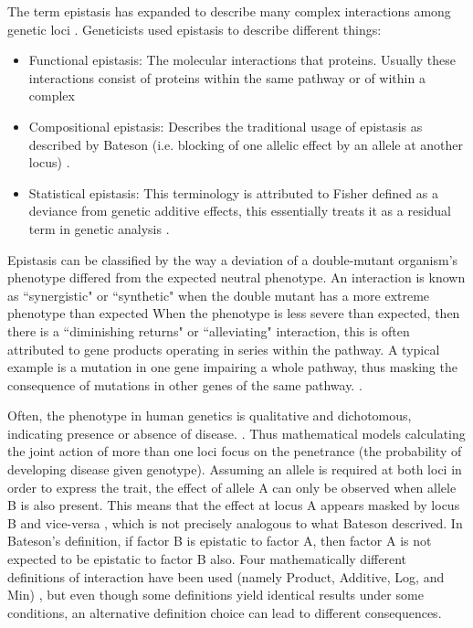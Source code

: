 The term epistasis has expanded to describe many complex interactions among genetic loci  \cite{phillips2008epistasis}.
Geneticists used epistasis to describe different things: 
\begin{itemize}
	\item Functional epistasis: The molecular interactions that proteins. Usually these interactions consist of proteins within the same pathway or of within a complex \cite{phillips2008epistasis}
	\item Compositional epistasis: Describes the traditional usage of epistasis as described by Bateson (i.e. blocking of one allelic effect by an allele at another locus)  \cite{phillips2008epistasis}.
	\item Statistical epistasis: This terminology is attributed to Fisher defined as a deviance from genetic additive effects, this essentially treats it as a residual term in genetic analysis \cite{zhao2006test}.
\end{itemize}

Epistasis can be classified by the way a deviation of a double-mutant organism's phenotype differed from the expected neutral phenotype\cite{mani2008defining}.
An interaction is known as ``synergistic" or ``synthetic" when the double mutant has a more extreme phenotype than expected
When the phenotype is less severe than expected, then there is a ``diminishing returns" or ``alleviating" interaction, this is often attributed to gene products operating in series within the pathway. 
A typical example is a mutation in one gene impairing a whole pathway, thus masking the consequence of mutations in other genes of the same pathway. \cite{mani2008defining}.

Often, the phenotype in human genetics is qualitative and dichotomous, indicating presence or absence of disease. \cite{cordell2002epistasis}.
Thus mathematical models calculating the joint action of more than one loci focus on the penetrance (the probability of developing disease given genotype).
Assuming an allele is required at both loci in order to express the trait, the effect of allele A can only be observed when allele B is also present.
This means that the effect at locus A appears masked by locus B and vice-versa \cite{cordell2002epistasis}, which is not precisely analogous to
what Bateson descrived. 
In Bateson's definition, if factor B is epistatic to factor A, then factor A is not expected to be epistatic to factor B also.  \cite{cordell2002epistasis}
Four mathematically different definitions of interaction have been used (namely Product, Additive, Log, and Min) \cite{mani2008defining}, but even though some definitions yield identical results under some conditions, an alternative definition choice can lead to different consequences\cite{mani2008defining}.

